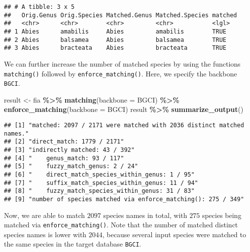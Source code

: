 \documentclass[
  11pt,
]{article}
\newenvironment{Shaded}{\begin{snugshade}}{\end{snugshade}}
\newcommand{\AttributeTok}[1]{\textcolor[rgb]{0.13,0.29,0.53}{#1}}
\newcommand{\FunctionTok}[1]{\textcolor[rgb]{0.13,0.29,0.53}{\textbf{#1}}}
\newcommand{\NormalTok}[1]{#1}
\newcommand{\OtherTok}[1]{\textcolor[rgb]{0.56,0.35,0.01}{#1}}
\newcommand{\SpecialCharTok}[1]{\textcolor[rgb]{0.81,0.36,0.00}{\textbf{#1}}}
\newcommand{\StringTok}[1]{\textcolor[rgb]{0.31,0.60,0.02}{#1}}
\begin{document}
\begin{verbatim}
## # A tibble: 3 x 5
##   Orig.Genus Orig.Species Matched.Genus Matched.Species matched
##   <chr>      <chr>        <chr>         <chr>           <lgl>  
## 1 Abies      amabilis     Abies         amabilis        TRUE   
## 2 Abies      balsamea     Abies         balsamea        TRUE   
## 3 Abies      bracteata    Abies         bracteata       TRUE
\end{verbatim}

\noindent We can further increase the number of matched species by using
the functions \verb|matching()| followed by \verb|enforce_matching()|.
Here, we specify the backbone \verb|BGCI|.

\begin{Shaded}
\begin{Highlighting}[]
\NormalTok{result }\OtherTok{\textless{}{-}}\NormalTok{ fia }\SpecialCharTok{\%\textgreater{}\%} 
  \FunctionTok{matching}\NormalTok{(}\AttributeTok{backbone =} \StringTok{\textquotesingle{}BGCI\textquotesingle{}}\NormalTok{) }\SpecialCharTok{\%\textgreater{}\%} 
  \FunctionTok{enforce\_matching}\NormalTok{(}\AttributeTok{backbone =} \StringTok{\textquotesingle{}BGCI\textquotesingle{}}\NormalTok{)}
\NormalTok{result }\SpecialCharTok{\%\textgreater{}\%} \FunctionTok{summarize\_output}\NormalTok{()}
\end{Highlighting}
\end{Shaded}

\begin{verbatim}
## [1] "matched: 2097 / 2171 were matched with 2036 distinct matched names."
## [2] "direct_match: 1779 / 2171"                                          
## [3] "indirectly matched: 43 / 392"                                       
## [4] "    genus_match: 93 / 117"                                          
## [5] "    fuzzy_match_genus: 2 / 24"                                      
## [6] "    direct_match_species_within_genus: 1 / 95"                      
## [7] "    suffix_match_species_within_genus: 11 / 94"                     
## [8] "    fuzzy_match_species_within_genus: 31 / 83"                      
## [9] "number of species matched via enforce_matching(): 275 / 349"
\end{verbatim}

\noindent Now, we are able to match \(2097\) species names in total,
with \(275\) species being matched via \verb|enforce_matching()|. Note
that the number of matched distinct species names is lower with
\(2044\), because several input species were matched to the same species
in the target database \verb|BGCI|.
\end{document}
